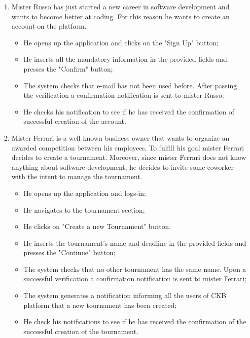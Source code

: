 \documentclass[../RASD.tex]{subfiles}
\begin{document}
        \begin{enumerate}
            \item {Mister Russo has just started a new career in software development and wants to become better at coding.
            For this reason he wants to create an account on the platform.
            \begin{itemize}
                \item {He opens up the application and clicks on the "Sign Up" button;}
                \item {He inserts all the mandatory information in the provided fields and presses the "Confirm" button;}
                \item {The system checks that e-mail has not been used before.
                After passing the verification a confirmation notification is sent to mister Russo;}
                \item {He checks his notification to see if he has received the confirmation of successful creation of the account.}
            \end{itemize}}
            \item {Mister Ferrari is a well known business owner that wants to organize an awarded competition between his employees.
            To fulfill his goal mister Ferrari decides to create a tournament.
            Moreover, since mister Ferrari does not know anything about software development, he decides to invite some coworker with the intent to manage the tournament. 
            \begin{itemize}
                \item {He opens up the application and logs-in;}
                \item {He navigates to the tournament section;}
                \item {He clicks on "Create a new Tournament" button;}
                \item {He inserts the tournament's name and deadline in the provided fields and presses the "Continue" button;}
                \item {The system checks that no other tournament has the same name.
                Upon a successful verification a confirmation notification is sent to mister Ferrari;}
                \item {The system generates a notification informing all the users of CKB platform that a new tournament has been created;}
                \item {He check his notifications to see if he has received the confirmation of the successful creation of the tournament.
}
\end{itemize}}
\end{enumerate}
\end{document}
